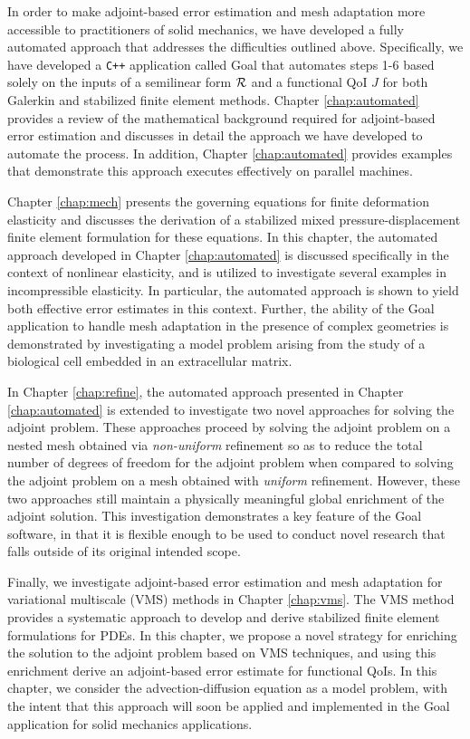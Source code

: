 In order to make adjoint-based error estimation and mesh adaptation
more accessible to practitioners of solid mechanics, we have developed
a fully automated approach that addresses the difficulties outlined
above. Specifically, we have developed a \texttt{C++} application called
Goal that automates steps 1-6 based solely on the inputs of a
semilinear form $\mathcal{R}$ and a functional QoI $J$ for both Galerkin and
stabilized finite element methods. Chapter \ref{chap:automated}
provides a review of the mathematical background required for
adjoint-based error estimation and discusses in detail the approach
we have developed to automate the process. In addition, Chapter
\ref{chap:automated} provides examples that demonstrate this approach
executes effectively on parallel machines.

Chapter \ref{chap:mech} presents the governing equations for
finite deformation elasticity and discusses the derivation
of a stabilized mixed pressure-displacement finite element
formulation for these equations. In this chapter, the automated
approach developed in Chapter \ref{chap:automated} is discussed
specifically in the context of nonlinear elasticity, and is utilized
to investigate several examples in incompressible elasticity.
In particular, the automated approach is shown to yield both
effective error estimates in this context. Further, the ability of the
Goal application to handle mesh adaptation in the presence of complex
geometries is demonstrated by investigating a model problem arising
from the study of a biological cell embedded in an extracellular
matrix.

In Chapter \ref{chap:refine}, the automated approach presented in
Chapter \ref{chap:automated} is extended to investigate two
novel approaches for solving the adjoint problem.
These approaches proceed by solving the adjoint problem on a
nested mesh obtained via \emph{non-uniform} refinement so as to
reduce the total number of degrees of freedom for the adjoint problem
when compared to solving the adjoint problem on a mesh obtained
with \emph{uniform} refinement. However, these two approaches still
maintain a physically meaningful global enrichment of the adjoint
solution. This investigation demonstrates a key feature of the Goal
software, in that it is flexible enough to be used to conduct novel
research that falls outside of its original intended scope.

Finally, we investigate adjoint-based error estimation and mesh
adaptation for variational multiscale (VMS) methods in Chapter \ref{chap:vms}.
The VMS method provides a systematic approach to develop and derive
stabilized finite element formulations for PDEs. In this chapter,
we propose a novel strategy for enriching the solution to the
adjoint problem based on VMS techniques, and using this enrichment
derive an adjoint-based error estimate for functional QoIs.
In this chapter, we consider the advection-diffusion equation as a
model problem, with the intent that this approach will soon
be applied and implemented in the Goal application for
solid mechanics applications.

